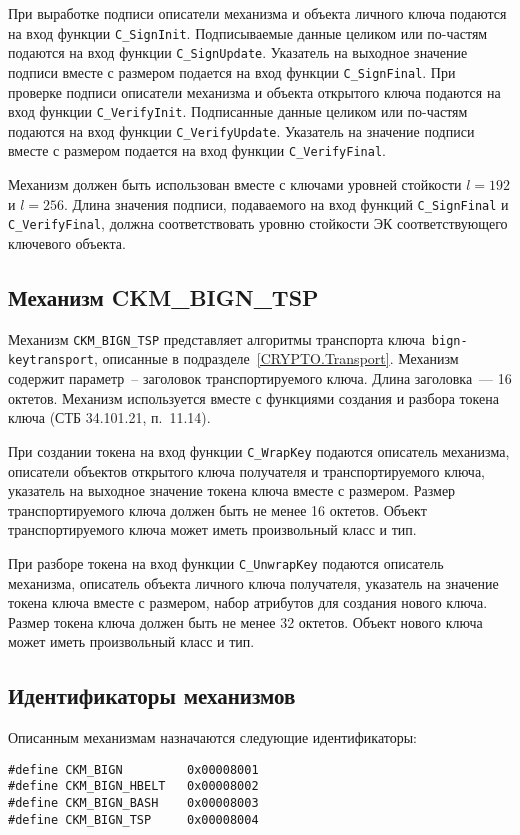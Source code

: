 При выработке подписи описатели механизма и объекта
личного ключа подаются на вход функции \verb|C_SignInit|.
Подписываемые данные целиком или по-частям подаются
на вход функции \verb|C_SignUpdate|.
Указатель на выходное значение подписи вместе с размером
подается на вход функции \verb|C_SignFinal|.
При проверке подписи описатели механизма и объекта
открытого ключа подаются на вход функции \verb|C_VerifyInit|.
Подписанные данные целиком или по-частям подаются
на вход функции \verb|C_VerifyUpdate|.
Указатель на значение подписи вместе с размером
подается на вход функции \verb|C_VerifyFinal|.

Механизм должен быть использован вместе с ключами 
уровней стойкости $l=192$ и $l=256$.
Длина значения подписи, подаваемого на вход функций
\verb|C_SignFinal| и \verb|C_VerifyFinal|, должна соответствовать
уровню стойкости ЭК соответствующего ключевого объекта.

\subsection{Механизм CKM\_BIGN\_TSP} %
Механизм
\verb|CKM_BIGN_TSP| представляет алгоритмы транспорта 
ключа~\texttt{bign-keytransport}, описанные в 
подразделе~\ref{CRYPTO.Transport}.
Механизм содержит параметр~--
заголовок транспортируемого ключа. Длина заголовка~--- 16 октетов.
Механизм используется вместе с функциями создания и
разбора токена ключа (СТБ 34.101.21, п.~11.14).

При создании токена на вход функции \verb|C_WrapKey| подаются
описатель механизма, описатели объектов открытого ключа
получателя и транспортируемого ключа, указатель на
выходное значение токена ключа вместе с размером.
Размер транспортируемого ключа должен быть не менее 16 октетов.
Объект транспортируемого ключа может иметь произвольный класс и тип. 

При разборе токена на вход функции \verb|C_UnwrapKey| подаются
описатель механизма, описатель объекта личного ключа
получателя, указатель на значение токена ключа вместе с размером,
набор атрибутов для создания нового ключа.
Размер токена ключа должен быть не менее 32 октетов.
Объект нового ключа может иметь произвольный класс и тип.

\subsection{Идентификаторы механизмов}

Описанным механизмам назначаются следующие идентификаторы:
\begin{verbatim}
#define CKM_BIGN         0x00008001
#define CKM_BIGN_HBELT   0x00008002
#define CKM_BIGN_BASH    0x00008003
#define CKM_BIGN_TSP     0x00008004
\end{verbatim}


